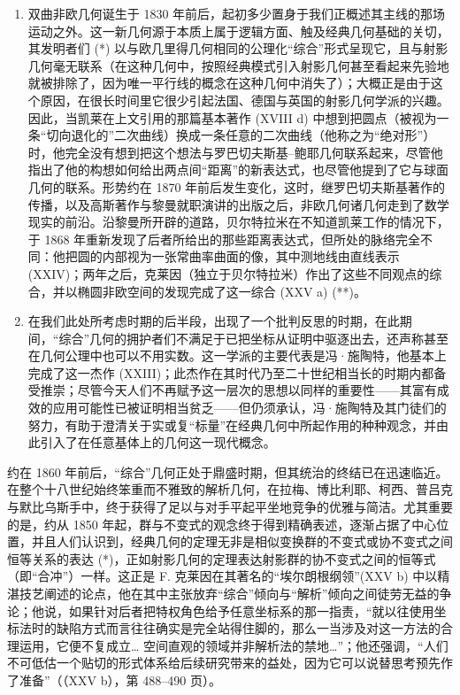 \begin{enumerate}
\item
  双曲非欧几何诞生于 1830 年前后，起初多少置身于我们正概述其主线的那场运动之外。这一新几何源于本质上属于逻辑方面、触及经典几何基础的关切，其发明者们 (*) 以与欧几里得几何相同的公理化“综合”形式呈现它，且与射影几何毫无联系（在这种几何中，按照经典模式引入射影几何甚至看起来先验地就被排除了，因为唯一平行线的概念在这种几何中消失了）；大概正是由于这个原因，在很长时间里它很少引起法国、德国与英国的射影几何学派的兴趣。因此，当凯莱在上文引用的那篇基本著作 (XVIII d) 中想到把圆点（被视为一条“切向退化的”二次曲线）换成一条任意的二次曲线（他称之为“绝对形”）时，他完全没有想到把这个想法与罗巴切夫斯基–鲍耶几何联系起来，尽管他指出了他的构想如何给出两点间“距离”的新表达式，也尽管他提到了它与球面几何的联系。形势约在 1870 年前后发生变化，这时，继罗巴切夫斯基著作的传播，以及高斯著作与黎曼就职演讲的出版之后，非欧几何诸几何走到了数学现实的前沿。沿黎曼所开辟的道路，贝尔特拉米在不知道凯莱工作的情况下，于 1868 年重新发现了后者所给出的那些距离表达式，但所处的脉络完全不同：他把圆的内部视为一张常曲率曲面的像，其中测地线由直线表示 (XXIV)；两年之后，克莱因（独立于贝尔特拉米）作出了这些不同观点的综合，并以椭圆非欧空间的发现完成了这一综合 (XXV a) (**)。
\item
  在我们此处所考虑时期的后半段，出现了一个批判反思的时期，在此期间，“综合”几何的拥护者们不满足于已把坐标从证明中驱逐出去，还声称甚至在几何公理中也可以不用实数。这一学派的主要代表是冯·施陶特，他基本上完成了这一杰作 (XXIII)；此杰作在其时代乃至二十世纪相当长的时期内都备受推崇；尽管今天人们不再赋予这一层次的思想以同样的重要性——其富有成效的应用可能性已被证明相当贫乏——但仍须承认，冯·施陶特及其门徒们的努力，有助于澄清关于实或复“标量”在经典几何中所起作用的种种观念，并由此引入了在任意基体上的几何这一现代概念。
\end{enumerate}

约在 1860 年前后，“综合”几何正处于鼎盛时期，但其统治的终结已在迅速临近。在整个十八世纪始终笨重而不雅致的解析几何，在拉梅、博比利耶、柯西、普吕克与默比乌斯手中，终于获得了足以与对手平起平坐地竞争的优雅与简洁。尤其重要的是，约从 1850 年起，群与不变式的观念终于得到精确表述，逐渐占据了中心位置，并且人们认识到，经典几何的定理无非是相似变换群的不变式或协不变式之间恒等关系的表达 (*)，正如射影几何的定理表达射影群的协不变式之间的恒等式（即“合冲”）一样。这正是 F. 克莱因在其著名的“埃尔朗根纲领”(XXV b) 中以精湛技艺阐述的论点，他在其中主张放弃“综合”倾向与“解析”倾向之间徒劳无益的争论；他说，如果针对后者把特权角色给予任意坐标系的那一指责，“就以往使用坐标法时的缺陷方式而言往往确实是完全站得住脚的，那么一当涉及对这一方法的合理运用，它便不复成立\ldots{} 空间直观的领域并非解析法的禁地\ldots{}”；他还强调，“人们不可低估一个贴切的形式体系给后续研究带来的益处，因为它可以说替思考预先作了准备”（（XXV b），第 488–490 页）。

